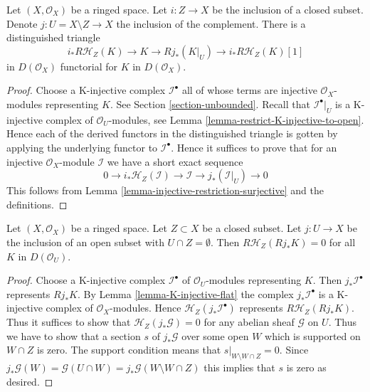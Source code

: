 \begin{lemma}
\label{lemma-triangle-sections-with-support-sheaves}
Let $(X, \mathcal{O}_X)$ be a ringed space. Let $i : Z \to X$ be the
inclusion of a closed subset. Denote $j : U = X \setminus Z \to X$
the inclusion of the complement. There is a distinguished triangle
$$
i_*R\mathcal{H}_Z(K) \to K \to Rj_*(K|_U) \to
i_*R\mathcal{H}_Z(K)[1]
$$
in $D(\mathcal{O}_X)$ functorial for $K$ in $D(\mathcal{O}_X)$.
\end{lemma}

\begin{proof}
Choose a K-injective complex $\mathcal{I}^\bullet$ all of whose terms
are injective $\mathcal{O}_X$-modules representing $K$. See
Section \ref{section-unbounded}. Recall that $\mathcal{I}^\bullet|_U$
is a K-injective complex of $\mathcal{O}_U$-modules, see
Lemma \ref{lemma-restrict-K-injective-to-open}. Hence each
of the derived functors in the distinguished triangle is gotten
by applying the underlying functor to $\mathcal{I}^\bullet$.
Hence it suffices to prove that
for an injective $\mathcal{O}_X$-module $\mathcal{I}$ we have
a short exact sequence
$$
0 \to i_*\mathcal{H}_Z(\mathcal{I}) \to \mathcal{I}
\to j_*(\mathcal{I}|_U) \to 0
$$
This follows from Lemma \ref{lemma-injective-restriction-surjective}
and the definitions.
\end{proof}

\begin{lemma}
\label{lemma-sections-support-in-closed-disjoint-open}
Let $(X, \mathcal{O}_X)$ be a ringed space. Let $Z \subset X$
be a closed subset. Let $j : U \to X$ be the inclusion of
an open subset with $U \cap Z = \emptyset$. Then
$R\mathcal{H}_Z(Rj_*K) = 0$ for all $K$ in $D(\mathcal{O}_U)$.
\end{lemma}

\begin{proof}
Choose a K-injective complex $\mathcal{I}^\bullet$ of $\mathcal{O}_U$-modules
representing $K$. Then $j_*\mathcal{I}^\bullet$ represents $Rj_*K$. By
Lemma \ref{lemma-K-injective-flat} the complex $j_*\mathcal{I}^\bullet$ is a
K-injective complex of $\mathcal{O}_X$-modules. Hence
$\mathcal{H}_Z(j_*\mathcal{I}^\bullet)$ represents $R\mathcal{H}_Z(Rj_*K)$.
Thus it suffices to show that $\mathcal{H}_Z(j_*\mathcal{G}) = 0$
for any abelian sheaf $\mathcal{G}$ on $U$. Thus we have to show that
a section $s$ of $j_*\mathcal{G}$ over some open $W$ which is supported
on $W \cap Z$ is zero. The support condition means that
$s|_{W \setminus W \cap Z} = 0$. Since $j_*\mathcal{G}(W) =
\mathcal{G}(U \cap W) = j_*\mathcal{G}(W \setminus W \cap Z)$
this implies that $s$ is zero as desired.
\end{proof}

